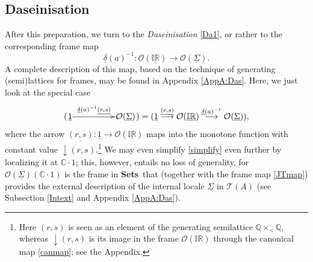 \documentclass[12pt]{article}
\newcommand{\IR}{\mathbb{IR}}
\newcommand{\Q}{\mathbb{Q}}
\newcommand{\uIR}{\underline{\mathbb{IR}}}
\newcommand{\beq}{\begin{equation}}
\newcommand{\eeq}{\end{equation}}
\newcommand{\Sets}{\mbox{\textbf{Sets}}}
\newcommand{\sr}{\stackrel}
\newcommand{\raw}{\rightarrow} \newcommand{\rat}{\mapsto}
\newcommand{\x}{\times} \newcommand{\hb}{\hbar}
\newcommand{\inv}{^{-1}}
\newcommand{\er}{\eqref}
\newcommand{\dl}{\delta} \newcommand{\Dl}{\Delta}
\newcommand{\CO}{{\mathcal O}} \newcommand{\CP}{{\mathcal P}}
\newcommand{\C}{{\mathbb C}} \newcommand{\D}{{\mathbb D}}
\newcommand{\alg}[1]{\ensuremath{#1}}
\newcommand{\functor}[1]{\ensuremath{\underline{#1}}}
\newcommand{\asstopos}{\ensuremath{\mathcal{T}}}
\newcommand{\TA}{\mathcal{T}(A)}
\newcommand{\ulS}{\functor{\Sigma}}
\renewcommand{\TA}{\asstopos(\alg{A})}
\begin{document}
\subsection{Daseinisation}\label{sec:Das}
After this preparation, we turn to the
{\it Daseinisation} \er{Da1}, or rather to the corresponding frame map
 \beq
\underline{\dl}(a)\inv:  \CO(\underline{\IR}) \raw \CO(\ulS).\label{Da22}\eeq
A complete description of this map, based on the technique of generating (semi)lattices for frames, may be found in Appendix \ref{AppA:Das}. Here, we 
 just look at  the special case
\beq (\xymatrix@1{\underline{1}\ar^-{\underline{\dl}(a)\inv \underline{(r,s)}}[rr] &&  \CO(\ulS)})
= (\underline{1}\sr{\underline{(r,s)}}{\longrightarrow}\CO(\uIR)\sr{\underline{\dl}(a)\inv}{\longrightarrow}\CO(\ulS)),
\label{simplify}
\eeq
where the arrow $\underline{(r,s)}:\underline{1}\raw \CO(\uIR)$ maps into the monotone function  with constant value $\downarrow\!(r,s)$.\footnote{Here $(r,s)$ is seen as an element of the generating semilattice $\Q\x_{<}\Q$, whereas
$\downarrow\!(r,s)$ is its image in the frame $\CO(\IR)$ through the canonical map \er{canmap}; see the Appendix.} 
We may even simplify  \er{simplify} even further by localizing it  at $\C\cdot 1$; this,  however, entails no loss of generality, 
for $\CO(\ulS)(\C\cdot 1)$ is the frame in \Sets\ that (together with the frame map \er{JTmap}) provides the external description
of the internal locale $\ulS$ in $\TA$ (see Subsection \ref{Intext} and Appendix  \ref{AppA:Das}).
\end{document}
